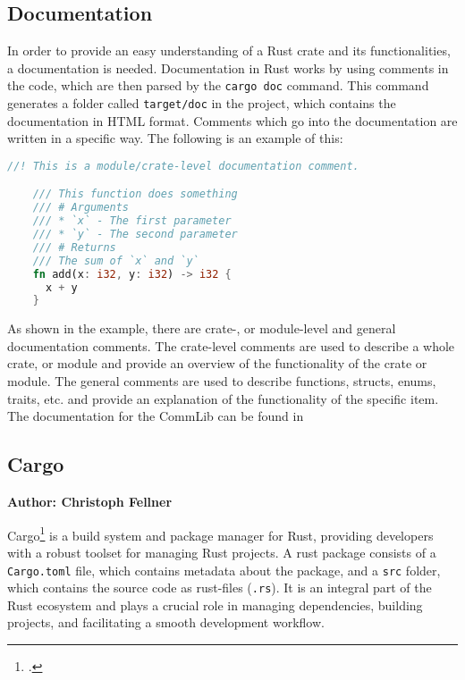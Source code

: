 \subsection{Documentation}
In order to provide an easy understanding of a Rust crate and its functionalities, a documentation is needed.
Documentation in Rust works by using comments in the code, which are then parsed by the \verb+cargo doc+ command. 
This command generates a folder called \verb+target/doc+ in the project, which contains the documentation in HTML format.
Comments which go into the documentation are written in a specific way.
The following is an example of this: 

\begin{minipage}{\textwidth}
  \begin{lstlisting}[language=Rust, caption=Example of a Documentation Comment]
    //! This is a module/crate-level documentation comment.

    /// This function does something
    /// # Arguments
    /// * `x` - The first parameter
    /// * `y` - The second parameter
    /// # Returns
    /// The sum of `x` and `y`
    fn add(x: i32, y: i32) -> i32 {
      x + y
    }
  \end{lstlisting}
\end{minipage}

As shown in the example, there are crate-, or module-level and general documentation comments. 
The crate-level comments are used to describe a whole crate, or module and provide an overview of the functionality of the crate or module.
The general comments are used to describe functions, structs, enums, traits, etc. and provide 
an explanation of the functionality of the specific item. The documentation for the CommLib can be found in %

\subsection{Cargo}
\textbf{Author: Christoph Fellner}

Cargo\footcite{cargo} is a build system and package manager for Rust, providing developers with a robust toolset for managing Rust projects. A rust package consists of a
\verb+Cargo.toml+ file, which contains metadata about the package, and a \verb+src+ folder, which contains the source code as rust-files (\verb+.rs+). It is an integral 
part of the Rust ecosystem and plays a crucial role in managing dependencies, building projects, and facilitating a smooth development workflow.

